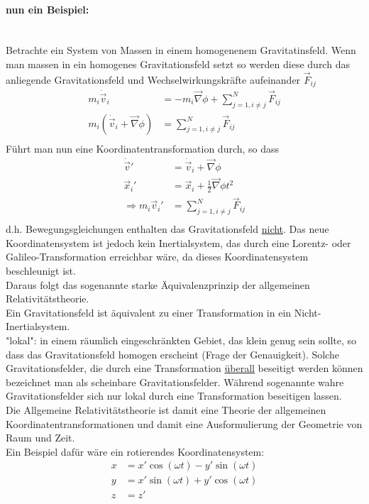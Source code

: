 \documentclass[a4paper]{article}
\begin{document}
\paragraph{nun ein Beispiel:}~\\
Betrachte ein System von Massen in einem homogenenem Gravitatinsfeld.
Wenn man massen in ein homogenes Gravitationsfeld setzt so werden diese durch
das anliegende Gravitationsfeld und Wechselwirkungskräfte aufeinander
$\vec{F}_{ij}$
\begin{align}
m_i \dot{\vec{v}}_i&=-m_i\vec{\nabla}\phi+\sum_{j=1,i\neq j}^N\vec{F}_{ij}\\
m_i (\dot{\vec{v}}_i+\vec{\nabla}\phi)&=\sum_{j=1,i\neq j}^N\vec{F}_{ij}\\
\end{align}
Führt man nun eine Koordinatentransformation durch, so dass
\begin{align}
\dot{\vec{v}}{}'&=\dot{\vec{v}}_i+\vec{\nabla}\phi\\
\vec{x}_i{}'&=\vec{x}_i+\frac{1}{2}\vec{\nabla}\phi t^2\\
\Rightarrow m_i\vec{v}_i{}'&=\sum_{j=1,i\neq j}^N\vec{F}_{ij}\\
\end{align}
d.h. Bewegungsgleichungen enthalten das Gravitationsfeld \underline{nicht}. Das
neue Koordinatensystem ist jedoch kein Inertialsystem, das durch eine
Lorentz- oder Galileo-Transformation erreichbar wäre, da dieses
Koordinatensystem beschleunigt ist.\\
Daraus folgt das sogenannte starke Äquivalenzprinzip der allgemeinen
Relativitätstheorie.\\
Ein Gravitationsfeld ist äquivalent zu einer Transformation in ein
Nicht- Inertialsystem.\\
"lokal": in einem räumlich eingeschränkten Gebiet, das klein genug sein sollte,
so dass das Gravitationsfeld homogen erscheint (Frage der Genauigkeit).
Solche Gravitationsfelder, die durch eine Transformation \underline{überall}
beseitigt werden können bezeichnet man als scheinbare Gravitationsfelder.
Während sogenannte wahre Gravitationsfelder sich nur lokal durch eine
Transformation beseitigen lassen.\\
Die Allgemeine Relativitätstheorie ist damit eine Theorie der allgemeinen
Koordinatentransformationen und damit eine Ausformulierung der Geometrie von
Raum und Zeit.\\ 
Ein Beispiel dafür wäre ein rotierendes Koordinatensystem:
\begin{align}
x&=x'\cos(\omega t)-y'\sin(\omega t)\\
y&=x'\sin(\omega t)+y'\cos(\omega t)\\
z&=z'
\end{align}
\end{document}
